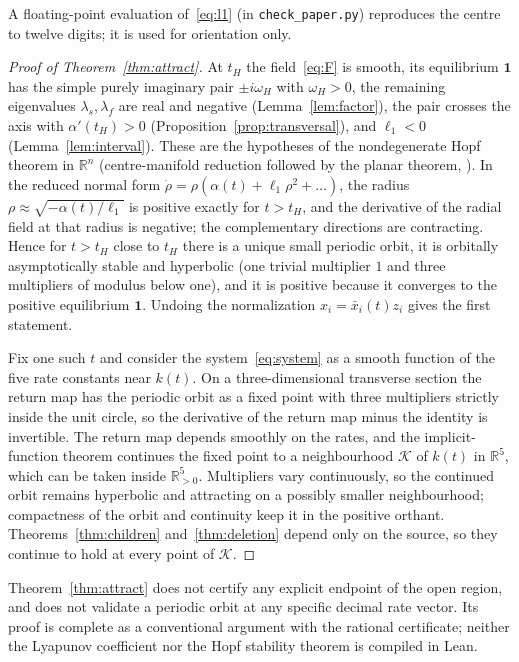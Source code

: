\documentclass[11pt,a4paper]{article}
\theoremstyle{plain}
\theoremstyle{definition}
\theoremstyle{remark}
\newcommand{\R}{\mathbb{R}}
\newcommand{\ones}{\mathbf{1}}
\newcommand{\xbar}{\bar x}
\begin{document}
A floating-point evaluation of~\eqref{eq:l1} (in \texttt{check\_paper.py}) reproduces the centre to twelve digits; it is used for orientation only.

\begin{proof}[Proof of Theorem~\ref{thm:attract}]
At $t_H$ the field~\eqref{eq:F} is smooth, its equilibrium $\ones$ has the simple purely imaginary pair $\pm i\omega_H$ with $\omega_H>0$, the remaining eigenvalues $\lambda_s,\lambda_f$ are real and negative (Lemma~\ref{lem:factor}), the pair crosses the axis with $\alpha'(t_H)>0$ (Proposition~\ref{prop:transversal}), and $\ell_1<0$ (Lemma~\ref{lem:interval}). These are the hypotheses of the nondegenerate Hopf theorem in $\R^n$ (centre-manifold reduction followed by the planar theorem, \cite[\S\S3.4--3.5 and \S5.4]{Kuznetsov2004}). In the reduced normal form $\dot\rho=\rho(\alpha(t)+\ell_1\rho^2+\dots)$, the radius $\rho\approx\sqrt{-\alpha(t)/\ell_1}$ is positive exactly for $t>t_H$, and the derivative of the radial field at that radius is negative; the complementary directions are contracting. Hence for $t>t_H$ close to $t_H$ there is a unique small periodic orbit, it is orbitally asymptotically stable and hyperbolic (one trivial multiplier $1$ and three multipliers of modulus below one), and it is positive because it converges to the positive equilibrium $\ones$. Undoing the normalization $x_i=\xbar_i(t)z_i$ gives the first statement.

Fix one such $t$ and consider the system~\eqref{eq:system} as a smooth function of the five rate constants near $k(t)$. On a three-dimensional transverse section the return map has the periodic orbit as a fixed point with three multipliers strictly inside the unit circle, so the derivative of the return map minus the identity is invertible. The return map depends smoothly on the rates, and the implicit-function theorem continues the fixed point to a neighbourhood $\mathcal K$ of $k(t)$ in $\R^5$, which can be taken inside $\R_{>0}^5$. Multipliers vary continuously, so the continued orbit remains hyperbolic and attracting on a possibly smaller neighbourhood; compactness of the orbit and continuity keep it in the positive orthant. Theorems~\ref{thm:children} and~\ref{thm:deletion} depend only on the source, so they continue to hold at every point of $\mathcal K$.
\end{proof}

Theorem~\ref{thm:attract} does not certify any explicit endpoint of the open region, and does not validate a periodic orbit at any specific decimal rate vector. Its proof is complete as a conventional argument with the rational certificate; neither the Lyapunov coefficient nor the Hopf stability theorem is compiled in Lean.
\end{document}
